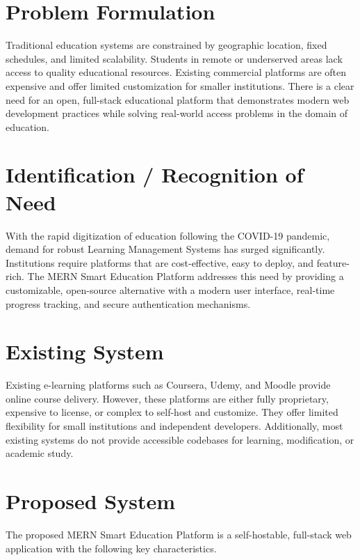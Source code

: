 \documentclass[12pt, a4paper, oneside]{report}
\begin{document}
\section{Problem Formulation}

Traditional education systems are constrained by geographic location, fixed schedules, and limited scalability. Students in remote or underserved areas lack access to quality educational resources. Existing commercial platforms are often expensive and offer limited customization for smaller institutions. There is a clear need for an open, full-stack educational platform that demonstrates modern web development practices while solving real-world access problems in the domain of education.

\section{Identification / Recognition of Need}

With the rapid digitization of education following the COVID-19 pandemic, demand for robust Learning Management Systems has surged significantly. Institutions require platforms that are cost-effective, easy to deploy, and feature-rich. The MERN Smart Education Platform addresses this need by providing a customizable, open-source alternative with a modern user interface, real-time progress tracking, and secure authentication mechanisms.

\section{Existing System}

Existing e-learning platforms such as Coursera, Udemy, and Moodle provide online course delivery. However, these platforms are either fully proprietary, expensive to license, or complex to self-host and customize. They offer limited flexibility for small institutions and independent developers. Additionally, most existing systems do not provide accessible codebases for learning, modification, or academic study.

\section{Proposed System}

The proposed MERN Smart Education Platform is a self-hostable, full-stack web application with the following key characteristics.
\end{document}
